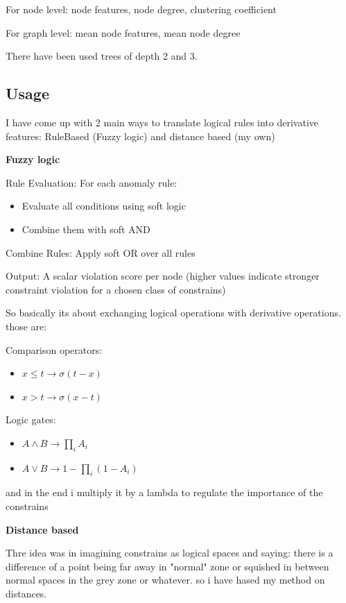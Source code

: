 \documentclass[a4paper,12pt]{article}
\begin{document}
For node level: node features, node degree, clustering coefficient

For graph level: mean node features, mean node degree

There have been used trees of depth 2 and 3.

\subsection{Usage}

I have come up with 2 main ways to translate logical rules into derivative features: RuleBased (Fuzzy logic) and distance based (my own)

\textbf{Fuzzy logic}

Rule Evaluation: For each anomaly rule:
\begin{itemize}
    \item Evaluate all conditions using soft logic
    \item Combine them with soft AND
\end{itemize}
Combine Rules: Apply soft OR over all rules

Output: A scalar violation score per node (higher values indicate stronger constraint violation for a chosen class of constrains)
    
So basically its about exchanging logical operations with derivative operations. those are:

Comparison operators:
\begin{itemize}
    \item $x \leq t \rightarrow \sigma(t - x)$
    \item $x > t \rightarrow \sigma(x - t)$
\end{itemize}

Logic gates:
\begin{itemize}
    \item $A \land B \rightarrow \prod_i A_i$
    \item $A \lor B \rightarrow 1 - \prod_i (1 - A_i)$
\end{itemize}

and in the end i multiply it by a lambda to regulate the importance of the constrains

\textbf{Distance based}

Thre idea was in imagining constrains as logical spaces and saying: there is a difference of a point being far away in "normal" zone or squished in between normal spaces in the grey zone or whatever. so i have hased my method on distances.
\end{document}
